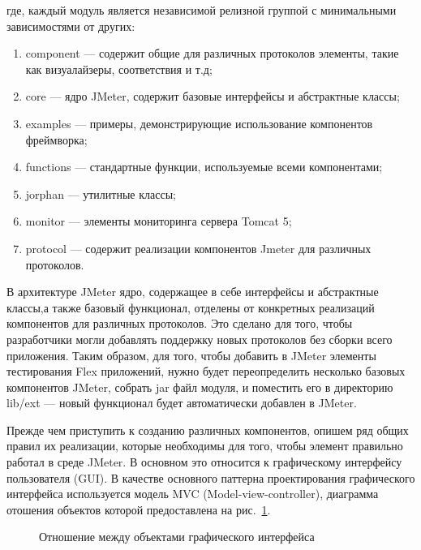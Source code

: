 где, каждый модуль является независимой релизной группой с минимальными зависимостями от других:
\begin{enumerate}
\item component --- содержит общие для различных протоколов элементы, такие как визуалайзеры,
соответствия и т.д;
\item core --- ядро JMeter, содержит базовые интерфейсы и абстрактные классы;
\item examples --- примеры, демонстрирующие использование компонентов фреймворка;
\item functions --- стандартные функции, используемые всеми компонентами;
\item jorphan --- утилитные классы;
\item monitor --- элементы мониторинга сервера Tomcat 5;
\item protocol --- содержит реализации компонентов Jmeter для различных протоколов.
\end{enumerate}

В архитектуре JMeter ядро, содержащее в себе интерфейсы и абстрактные классы,а также базовый функционал,
отделены от конкретных реализаций компонентов для различных протоколов. Это сделано для того, чтобы разработчики
могли добавлять поддержку новых протоколов без сборки всего приложения. Таким образом, для того, чтобы добавить
в JMeter элементы тестирования Flex приложений, нужно будет переопределить несколько базовых
компонентов JMeter, собрать jar файл модуля, и поместить его в директорию lib/ext --- новый функционал будет
автоматически добавлен в JMeter.

Прежде чем приступить к созданию различных компонентов, опишем ряд общих правил их реализации,
которые необходимы для того, чтобы элемент правильно работал в среде JMeter. В основном это относится к
графическому интерфейсу пользователя (GUI). В качестве основного паттерна проектирования графического
интерфейса используется модель MVC (Model-view-controller), диаграмма отошения объектов которой предоставлена на рис.~\ref{ris:Diagram2.png}.

\begin{figure}[ht]
\caption{Отношение между объектами графического интерфейса}
\label{ris:Diagram2.png}
\end{figure}

